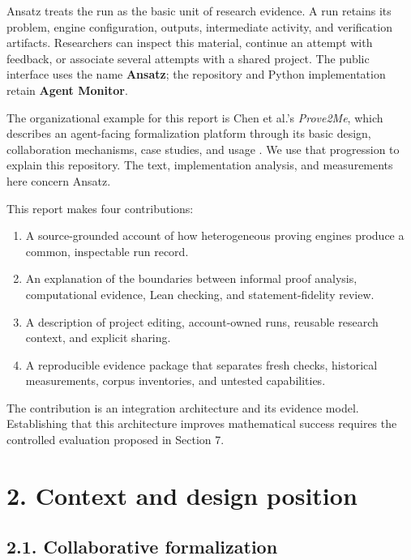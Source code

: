 \documentclass[11pt,a4paper]{article}
\begin{document}
Ansatz treats the run as the basic unit of research evidence. A run retains its problem, engine configuration, outputs, intermediate activity, and verification artifacts. Researchers can inspect this material, continue an attempt with feedback, or associate several attempts with a shared project. The public interface uses the name \textbf{Ansatz}; the repository and Python implementation retain \textbf{Agent Monitor}.

The organizational example for this report is Chen et al.'s \emph{Prove2Me}, which describes an agent-facing formalization platform through its basic design, collaboration mechanisms, case studies, and usage \cite{prove2me}. We use that progression to explain this repository. The text, implementation analysis, and measurements here concern Ansatz.

This report makes four contributions:

\begin{enumerate}

\item A source-grounded account of how heterogeneous proving engines produce a common, inspectable run record.

\item An explanation of the boundaries between informal proof analysis, computational evidence, Lean checking, and statement-fidelity review.

\item A description of project editing, account-owned runs, reusable research context, and explicit sharing.

\item A reproducible evidence package that separates fresh checks, historical measurements, corpus inventories, and untested capabilities.

\end{enumerate}

The contribution is an integration architecture and its evidence model. Establishing that this architecture improves mathematical success requires the controlled evaluation proposed in Section 7.

\section*{2. Context and design position}

\subsection*{2.1. Collaborative formalization}
\end{document}
